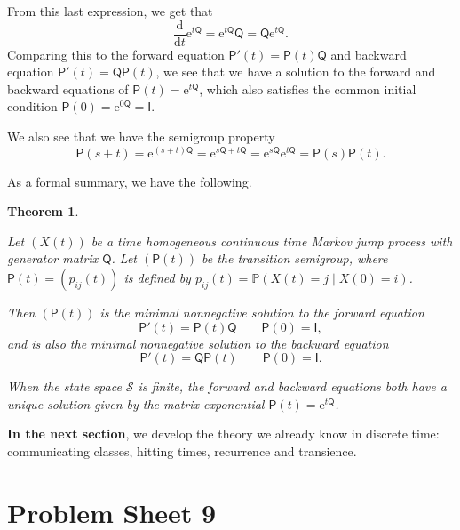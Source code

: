 \documentclass[
  a4paper,
]{article}
\newif\ifcomm\commtrue
\newtheorem{theorem}{Theorem}[section]
\theoremstyle{definition}
\theoremstyle{definition}
\theoremstyle{definition}
\theoremstyle{remark}
\begin{document}
From this last expression, we get that
\[ \frac{\mathrm d}{\mathrm d t} \mathrm{e}^{t{\mathsf Q}} = \mathrm{e}^{t{\mathsf Q}} {\mathsf Q} = {\mathsf Q} \mathrm{e}^{t{\mathsf Q}}  . \]
Comparing this to the forward equation \(\mathsf P'(t) = \mathsf{P}(t) \mathsf Q\) and backward equation \(\mathsf{P}'(t) = \mathsf Q \mathsf{P}(t)\), we see that we have a solution to the forward and backward equations of \(\mathsf P(t) = \mathrm{e}^{t\mathsf Q}\), which also satisfies the common initial condition \(\mathsf P(0) = \mathrm{e}^{0\mathsf Q} = \mathsf I\).

We also see that we have the semigroup property
\[ \mathsf P(s+t) = \mathrm{e}^{(s+t)\mathsf Q} = \mathrm{e}^{s \mathsf Q + t \mathsf Q} = \mathrm{e}^{s \mathsf Q}\mathrm{e}^{t \mathsf Q} = \mathsf P(s) \mathsf P(t) . \]

As a formal summary, we have the following.

\begin{theorem}
\protect\hypertarget{thm:exp-thm}{}\label{thm:exp-thm}

Let \((X(t))\) be a time homogeneous continuous time Markov jump process with generator matrix \(\mathsf Q\). Let \((\mathsf P(t))\) be the transition semigroup, where \(\mathsf P(t) = (p_{ij}(t))\) is defined by \(p_{ij}(t) = \mathbb P(X(t) = j \mid X(0) = i)\).

Then \((\mathsf P(t))\) is the minimal nonnegative solution to the forward equation
\[ \mathsf P'(t) = \mathsf P(t) \mathsf Q \qquad \mathsf P(0) = \mathsf I , \]
and is also the minimal nonnegative solution to the backward equation
\[ \mathsf P'(t) = \mathsf Q \mathsf P(t) \qquad \mathsf P(0) = \mathsf I . \]

When the state space \(\mathcal S\) is finite, the forward and backward equations both have a unique solution given by the matrix exponential \(\mathsf P(t) = \mathrm{e}^{t \mathsf Q}\).

\end{theorem}

\textbf{In the next section}, we develop the theory we already know in discrete time: communicating classes, hitting times, recurrence and transience.

\hypertarget{P09}{%
\section*{Problem Sheet 9}\label{P09}}

\commfalse
\end{document}
